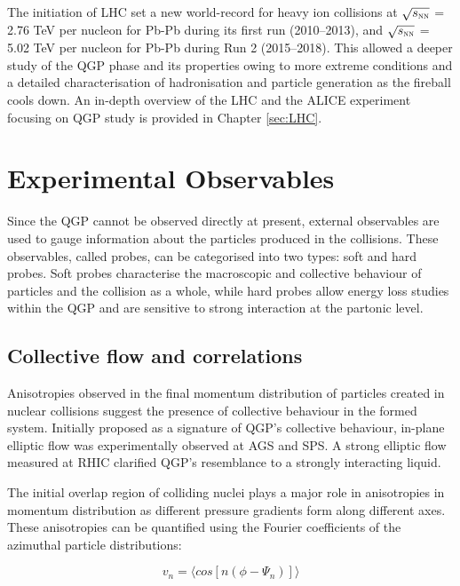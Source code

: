 The initiation of LHC set a new world-record for heavy ion collisions at $\sqrt{s_{\textnormal{\sc nn}}}$ = 2.76 TeV per nucleon for Pb-Pb during its first
run (2010--2013), and $\sqrt{s_{\textnormal{\sc nn}}}$ = 5.02 TeV per nucleon for Pb-Pb during Run 2 (2015--2018). This allowed a deeper study of the QGP
phase and its properties owing to more extreme conditions and a detailed characterisation of hadronisation and particle generation as the fireball cools down.
An in-depth overview of the LHC and the ALICE experiment focusing on QGP study is provided in Chapter \ref{sec:LHC}.

\section{Experimental Observables}

Since the QGP cannot be observed directly at present, external observables are used to gauge information about the particles produced in the
collisions. These observables, called probes, can be categorised into two types: soft and hard probes. Soft probes characterise the macroscopic and
collective behaviour of particles and the collision as a whole, while hard probes allow energy loss studies within the QGP and are sensitive to strong
interaction at the partonic level.

\subsection{Collective flow and correlations}
Anisotropies observed in the final momentum distribution of particles created in nuclear collisions suggest the presence of collective behaviour in the
formed system. Initially proposed as a signature of QGP's collective behaviour, in-plane elliptic flow was experimentally observed at
AGS\cite{FlowAGS:1994} and SPS\cite{FlowSPS:2003}. A strong elliptic flow measured at RHIC clarified QGP's resemblance to a strongly interacting
liquid\cite{Adams:2005}.

The initial overlap region of colliding nuclei plays a major role in anisotropies in momentum distribution as different pressure gradients form along
different axes. These anisotropies can be quantified using the Fourier coefficients of the azimuthal particle distributions:

\begin{equation}
    v_{n} = \langle cos[n(\phi - \Psi_{n})]\rangle
    \label{eq:fourier}
\end{equation}

